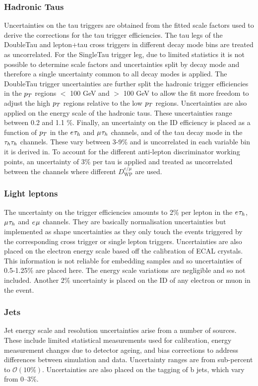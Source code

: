 \subsubsection{Hadronic Taus}
Uncertainties on the tau triggers are obtained from the fitted scale factors used to derive the corrections for the tau trigger efficiencies.
The tau legs of the DoubleTau and lepton+tau cross triggers in different decay mode bins are treated as uncorrelated.
For the SingleTau trigger leg, due to limited statistics it is not possible to determine scale factors and uncertainties split by decay mode and therefore a single uncertainty common to all decay modes is applied.
The DoubleTau trigger uncertainties are further split the hadronic trigger efficiencies in the $p_{T}$ regions $<$ 100 GeV and $>$ 100 GeV to allow the fit more freedom to adjust the high $p_{T}$ regions relative to the low $p_{T}$ regions.
Uncertainties are also applied on the energy scale of the hadronic taus. 
These uncertainties range between 0.2 and 1.1 \%. 
Finally, an uncertainty on the ID efficiency is placed as a function of $p_{T}$ in the $e_{}\tau_{h}$ and $\mu_{}\tau_{h}$ channels, and of the tau decay mode in the $\tau_{h}\tau_{h}$ channels. 
These vary between 3-9\% and is uncorrelated in each variable bin it is derived in.
To account for the different anti-lepton discriminator working points, an uncertainty of 3\% per tau is applied and treated as uncorrelated between the channels where different $D_{\text{WP}}^{e/\mu}$ are used.

\subsubsection{Light leptons}
The uncertainty on the trigger efficiencies amounts to 2\% per lepton in the $e_{}\tau_{h}$, $\mu_{}\tau_{h}$ and $e_{}\mu_{}$ channels.
They are basically normalisation uncertainties but implemented as shape uncertainties as they only touch the events triggered by the corresponding cross trigger or single lepton triggers.
Uncertainties are also placed on the electron energy scale based off the calibration of ECAL crystals.
This information is not reliable for embedding samples and so uncertainties of 0.5-1.25\% are placed here. 
The energy scale variations are negligible and so not included.
Another 2\% uncertainty is placed on the ID of any electron or muon in the event.

\subsubsection{Jets}
Jet energy scale and resolution uncertainties arise from a number of sources. 
These include limited statistical measurements used for calibration, energy measurement changes due to detector ageing, and bias corrections to address differences between simulation and data. 
Uncertainty ranges are from sub-percent to $\mathcal{O}(10\%)$.
Uncertainties are also placed on the tagging of b jets, which vary from 0--3\%.


